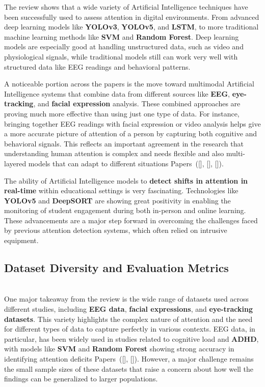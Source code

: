 \documentclass[12pt]{article}
\begin{document}
The review shows that a wide variety of Artificial Intelligence techniques have been successfully used to assess attention in digital environments. From advanced deep learning models like \textbf{YOLOv3}, \textbf{YOLOv5}, and \textbf{LSTM}, to more traditional machine learning methods like \textbf{SVM} and \textbf{Random Forest}. Deep learning models are especially good at handling unstructured data, such as video and physiological signals, while traditional models still can work very well with structured data like EEG readings and behavioral patterns.

A noticeable portion across the papers is the move toward multimodal Artificial Intelligence systems that combine data from different sources like \textbf{EEG}, \textbf{eye-tracking}, and \textbf{facial expression} analysis. These combined approaches are proving much more effective than using just one type of data. For instance, bringing together EEG readings with facial expression or video analysis helps give a more accurate picture of attention of a person by capturing both cognitive and behavioral signals. This reflects an important agreement in the research that understanding human attention is complex and needs flexible and also multi-layered models that can adapt to different situations Papers~([\citealp{ref1}], [\citealp{ref7}], [\citealp{ref16}]).

The ability of Artificial Intelligence models to \textbf{detect shifts in attention in real-time} within educational settings is very fascinating. Technologies like \textbf{YOLOv5} and \textbf{DeepSORT} are showing great positivity in enabling the monitoring of student engagement during both in-person and online learning. These advancements are a major step forward in overcoming the challenges faced by previous attention detection systems, which often relied on intrusive equipment. 

\subsection{ Dataset Diversity and Evaluation Metrics} \\

One major takeaway from the review is the wide range of datasets used across different studies, including \textbf{EEG data}, \textbf{facial expressions}, and \textbf{eye-tracking datasets}. This variety highlights the complex nature of attention and the need for different types of data to capture perfectly in various contexts. EEG data, in particular, has been widely used in studies related to cognitive load and \textbf{ADHD}, with models like \textbf{SVM} and \textbf{Random Forest} showing strong accuracy in identifying attention deficits Papers~([\citealp{ref11}], [\citealp{ref19}]). However, a major challenge remains the small sample sizes of these datasets that raise a concern about how well the findings can be generalized to larger populations.
\end{document}
